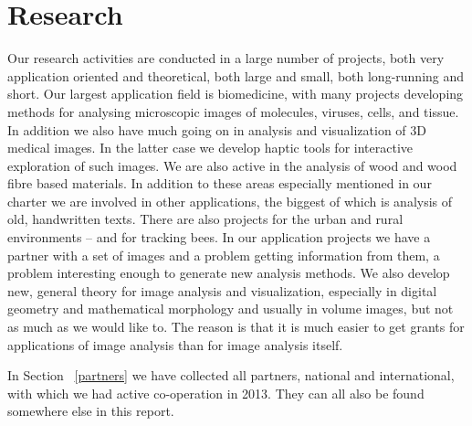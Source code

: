 \documentclass[10pt, a4paper]{article}
\begin{document}
\newcommand{\commentfigure}[1]{}
\newcommand{\researcharea}[1]{\subsection{#1}}

\section{Research}\label{research}
\label{research_proj}
{\large
Our research activities are conducted in a large number of projects, both very application oriented and theoretical, both large and small, both long-running and short. Our largest application field is biomedicine, with many projects developing methods for analysing microscopic images of molecules, viruses, cells, and tissue. In addition we also have much going on in analysis and visualization of 3D medical images. In the latter case we develop haptic tools for interactive exploration of such images. We are also active in the analysis of wood and wood fibre based materials. In addition to these areas especially mentioned in our charter we are involved in other applications, the biggest of which is analysis of old, handwritten texts. There are also projects for the urban and rural environments -- and for tracking bees. In our application projects we have a partner with a set of images and a problem getting information from them, a problem interesting enough to generate new analysis methods. We also develop new, general theory for image analysis and visualization, especially in digital geometry and mathematical morphology and usually in volume images, but not as much as we would like to. The reason is that it is much easier to get grants for applications of image analysis than for image analysis itself.

In Section ~\ref{partners} we have collected all partners, national and international, with which we had active co-operation in 2013. They can all also be found somewhere else in this report.}
\vfill
\end{document}
